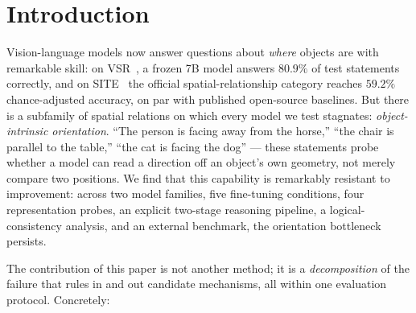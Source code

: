 \section{Introduction}
\label{sec:intro}

Vision-language models now answer questions about \emph{where} objects are with
remarkable skill: on VSR~\cite{liu2023vsr}, a frozen 7B model answers $80.9\%$ of
test statements correctly, and on SITE~\cite{wang2025site} the official
spatial-relationship category reaches $59.2\%$ chance-adjusted accuracy, on par
with published open-source baselines. But there is a subfamily of spatial
relations on which every model we test stagnates: \emph{object-intrinsic
orientation}. ``The person is facing away from the horse,'' ``the chair is parallel
to the table,'' ``the cat is facing the dog'' --- these statements probe whether a
model can read a direction off an object's own geometry, not merely compare two
positions. We find that this capability is remarkably resistant to improvement:
across two model families, five fine-tuning conditions, four representation
probes, an explicit two-stage reasoning pipeline, a logical-consistency analysis,
and an external benchmark, the orientation bottleneck persists.

The contribution of this paper is not another method; it is a
\emph{decomposition} of the failure that rules in and out candidate mechanisms,
all within one evaluation protocol. Concretely:

